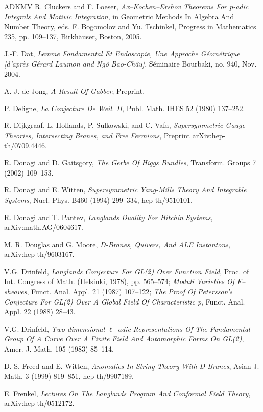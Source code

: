\begin{thebibliography}{ADKMV}
 R. Cluckers and F. Loeser, \emph{Ax--Kochen--Ershov Theorems For p-adic Integrals And Motivic Integration}, in Geometric Methods In Algebra And Number Theory, eds. F. Bogomolov and Yu. Tschinkel, Progress in Mathematics 235, pp. 109--137, Birkh\"auser, Boston, 2005.

 J.-F. Dat, \emph{Lemme Fondamental Et Endoscopie, Une Approche G\'eom\'etrique [d'apr\`es G\'erard Laumon and Ng\^o Bao-Ch\^au]}, S\'eminaire Bourbaki, no. 940, Nov. 2004.

 A. J. de Jong, \emph{A Result Of Gabber}, Preprint.

 P. Deligne, \emph{La Conjecture De Weil. II}, Publ. Math. IHES 52 (1980) 137--252.

 R. Dijkgraaf, L. Hollands, P. Sulkowski, and C. Vafa, \emph{Supersymmetric Gauge Theories, Intersecting Branes, and Free Fermions}, Preprint arXiv:hep-th/0709.4446.

 R. Donagi and D. Gaitsgory, \emph{The Gerbe Of Higgs Bundles}, Transform. Groups 7 (2002) 109--153.

 R. Donagi and E. Witten, \emph{Supersymmetric Yang-Mills Theory And Integrable Systems}, Nucl. Phys. B460 (1994) 299--334, hep-th/9510101.

 R. Donagi and T. Pantev, \emph{Langlands Duality For Hitchin Systems}, arXiv:math.AG/0604617.

 M. R. Douglas and G. Moore, \emph{D-Branes, Quivers, And ALE Instantons}, arXiv:hep-th/9603167.

 V.G. Drinfeld, \emph{Langlands Conjecture For GL(2) Over Function Field}, Proc. of Int. Congress of Math. (Helsinki, 1978), pp. 565--574; \emph{Moduli Varieties Of F--sheaves}, Funct. Anal. Appl. 21 (1987) 107--122; \emph{The Proof Of Petersson's Conjecture For GL(2) Over A Global Field Of Characteristic p}, Funct. Anal. Appl. 22 (1988) 28--43.

 V.G. Drinfeld, \emph{Two-dimensional $\ell$--adic Representations Of The Fundamental Group Of A Curve Over A Finite Field And Automorphic Forms On GL(2)}, Amer. J. Math. 105 (1983) 85--114.

 D. S. Freed and E. Witten, \emph{Anomalies In String Theory With D-Branes}, Asian J. Math. 3 (1999) 819--851, hep-th/9907189.

 E. Frenkel, \emph{Lectures On The Langlands Program And Conformal Field Theory}, arXiv:hep-th/0512172.


\end{thebibliography}
